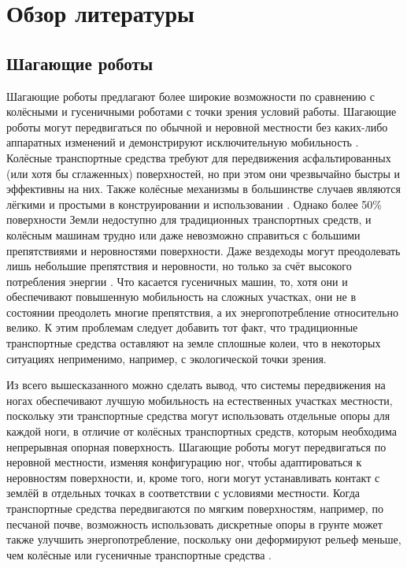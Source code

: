 \chapter{Обзор литературы}\label{ch:ch1}

\section{Шагающие роботы}\label{sec:ch1/sec1}

Шагающие роботы предлагают более широкие возможности по сравнению с колёсными и гусеничными роботами с точки зрения условий работы. Шагающие роботы могут передвигаться по обычной и неровной местности без каких-либо аппаратных изменений и демонстрируют исключительную мобильность \cite{Silva2012}. Колёсные транспортные средства требуют для передвижения асфальтированных (или хотя бы сглаженных) поверхностей, но при этом они чрезвычайно быстры и эффективны на них. Также колёсные механизмы в большинстве случаев являются лёгкими и простыми в конструировании и использовании \cite{Zen2006}. Однако более 50\% поверхности Земли недоступно для традиционных транспортных средств, и колёсным машинам трудно или даже невозможно справиться с большими препятствиями и неровностями поверхности. Даже вездеходы могут преодолевать лишь небольшие препятствия и неровности, но только за счёт высокого потребления энергии \cite{Bekker1962}.  Что касается гусеничных машин, то, хотя они и обеспечивают повышенную мобильность на сложных участках, они не в состоянии преодолеть многие препятствия, а их энергопотребление относительно велико. К этим проблемам следует добавить тот факт, что традиционные транспортные средства оставляют на земле сплошные колеи, что в некоторых ситуациях неприменимо, например, с экологической точки зрения. 

Из всего вышесказанного можно сделать вывод, что системы передвижения на ногах обеспечивают лучшую мобильность на естественных участках местности, поскольку эти транспортные средства могут использовать отдельные опоры для каждой ноги, в отличие от колёсных транспортных средств, которым необходима непрерывная опорная поверхность. Шагающие роботы могут передвигаться по неровной местности, изменяя конфигурацию ног, чтобы адаптироваться к неровностям поверхности, и, кроме того, ноги могут устанавливать контакт с землёй в отдельных точках в соответствии с условиями местности. Когда транспортные средства передвигаются по мягким поверхностям, например, по песчаной почве, возможность использовать дискретные опоры в грунте может также улучшить энергопотребление, поскольку они деформируют рельеф меньше, чем колёсные или гусеничные транспортные средства \cite{Iida2007}. 

